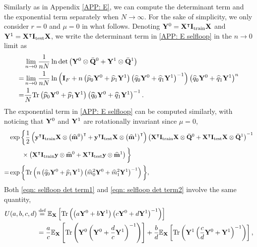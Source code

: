 \documentclass[9pt,twocolumn]{pnas-new}
\begin{document}
Similarly as in Appendix \ref{APP: E}, we can compute the determinant term and the exponential term separately when $N\to\infty$. For the sake of simplicity, we only consider $r=0$ and $\mu=0$ in what follows. Denoting $\mathbf{Y}^0=\mathbf{X}^{\intercal} \mathbf{I}_{\text{train}}\mathbf{X}$ and $\mathbf{Y}^1=\mathbf{X}^{\intercal} \mathbf{I}_{\text{test}}\mathbf{X}$, we write the determinant term in \eqref{APP: E selfloop} in the $n\to 0$ limit as
\begin{equation}\label{eqn: selfloop det term1}
    \begin{aligned}
        &\lim_{n \to 0}\frac{1}{nN}\ln\mathrm{det}\left( \mathbf{Y}^0 \otimes \bar{\mathbf{Q}}^{0} + \mathbf{Y}^1 \otimes \bar{\mathbf{Q}}^{1} \right)\\
        =&\lim_{n \to 0}\frac{1}{nN}\ln\left(\mathbf{I}_F+n\left(\widehat{p}_0 \mathbf{Y}^0+ \widehat{p}_1 \mathbf{Y}^1 \right)\left(\widehat{q}_0 \mathbf{Y}^0+ \widehat{q}_1 \mathbf{Y}^1 \right)^{-1}\right)\left(\widehat{q}_0 \mathbf{Y}^0+ \widehat{q}_1 \mathbf{Y}^1 \right)^n \\
        =&\frac{1}{N} \mathrm{Tr} \left(\widehat{p}_0 \mathbf{Y}^0+ \widehat{p}_1 \mathbf{Y}^1 \right)\left(\widehat{q}_0 \mathbf{Y}^0+ \widehat{q}_1 \mathbf{Y}^1 \right)^{-1}.
    \end{aligned}
\end{equation}
The exponential term in \eqref{APP: E selfloop} can be computed similarly, with noticing that $\mathbf{Y}^0$ and $\mathbf{Y}^1$ are rotationally invariant since $\mu=0$,
\begin{equation}\label{eqn: selfloop det term2}
    \begin{aligned}
        &\exp\bigg\{\frac{1}{2}\left( \mathbf{y}^{\intercal} \mathbf{I}_{\text{train}}\mathbf{X} \otimes \left(\widehat{\mathbf{m}}^{0}\right)^{\intercal} + \mathbf{y}^{\intercal} \mathbf{I}_{\text{test}}\mathbf{X} \otimes \left(\widehat{\mathbf{m}}^{1}\right)^{\intercal}\right)\left( \mathbf{X}^{\intercal} \mathbf{I}_{\text{train}}\mathbf{X} \otimes \bar{\mathbf{Q}}^{0}+\mathbf{X}^{\intercal} \mathbf{I}_{\text{test}}\mathbf{X} \otimes  \bar{\mathbf{Q}}^{1}\right)^{-1} \\
        & \quad \quad \times \left( \mathbf{X}^{\intercal} \mathbf{I}_{\text{train}}\mathbf{y} \otimes\widehat{\mathbf{m}}^{0}+\mathbf{X}^{\intercal} \mathbf{I}_{\text{test}}\mathbf{y}\otimes \widehat{\mathbf{m}}^{1}\right)\bigg\}\\
        =& \exp\bigg\{\mathrm{Tr}\left( n \left(\widehat{q}_0 \mathbf{Y}^0+ \widehat{p}_1 \mathbf{Y}^1 \right)\left(\widehat{m}^2_0 \mathbf{Y}^0+ \widehat{m}^2_1 \mathbf{Y}^1 \right)^{-1} \right)\bigg\},
    \end{aligned}
\end{equation}
Both \eqref{eqn: selfloop det term1} and \eqref{eqn: selfloop det term2} involve the same quantity,
\begin{equation}\label{eqn: T a b c d}
\begin{aligned}
    U(a,b,c,d) 
    &\overset{\text{def}}{=} \mathbb{E}_{\mathbf{X}} \left[\mathrm{Tr}\left(\left(a \mathbf{Y}^0+ b \mathbf{Y}^1 \right)\left(c \mathbf{Y}^0+ d \mathbf{Y}^1 \right)^{-1}\right) \right]\\
    &= \frac{a}{c} \mathbb{E}_{\mathbf{X}}\left[ \mathrm{Tr}\left( \mathbf{Y}^0\left(\mathbf{Y}^0+\frac{d}{c} \mathbf{Y}^1\right)^{-1}\right)\right]+\frac{b}{d}\mathbb{E}_{\mathbf{X}}\left[\mathrm{Tr}\left( \mathbf{Y}^1\left(\frac{c}{d}\mathbf{Y}^0+\mathbf{Y}^1\right)^{-1}\right)\right],
\end{aligned}
\end{equation}
\end{document}
